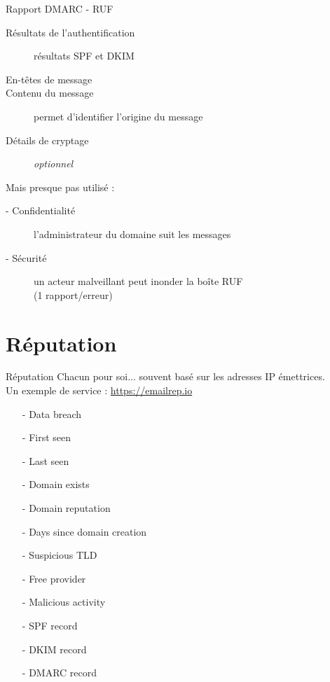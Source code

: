 \documentclass{beamer}
\begin{document}
\begin{frame}{Rapport DMARC - RUF}
    \begin{description}
        \item[Résultats de l'authentification] résultats SPF et DKIM
        \item[En-têtes de message]
        \item[Contenu du message] permet d'identifier l'origine du message
        \item[Détails de cryptage] \textit{optionnel}
    \end{description}
    \pause

    \vspace{1cm}

    Mais presque pas utilisé :
    \begin{description}
        \item[- Confidentialité] l'administrateur du domaine suit les messages
        \item[- Sécurité] un acteur malveillant peut inonder la boîte RUF \\ (1 rapport/erreur)
    \end{description}
\end{frame}

\section{Réputation}

\begin{frame}{Réputation}
    Chacun pour soi... souvent basé sur les adresses IP émettrices. \\
    Un exemple de service : \href{https://emailrep.io/}{https://emailrep.io}
    \begin{itemize}
        \item[-] Data breach
        \item[-] First seen
        \item[-] Last seen
        \item[-] Domain exists
        \item[-] Domain reputation
        \item[-] Days since domain creation
        \item[-] Suspicious TLD
        \item[-] Free provider
        \item[-] Malicious activity
        \item[-] SPF record
        \item[-] DKIM record
        \item[-] DMARC record
    \end{itemize}
\end{frame}
\end{document}
